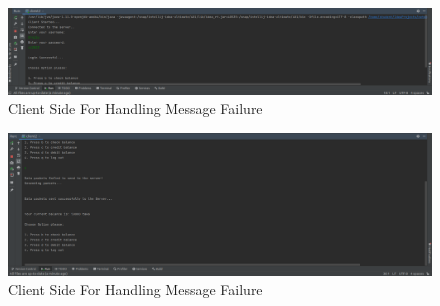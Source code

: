 \documentclass[11pt]{article}
\begin{document}
\begin{figure}[!h]
\centering
\includegraphics[width=\textwidth]{message1.png}
\caption{Client Side For Handling Message Failure}
\end{figure}
\begin{figure}[!h]
\centering
\includegraphics[width=\textwidth]{message2.png}
\caption{Client Side For Handling Message Failure}
\end{figure}
\end{document}
